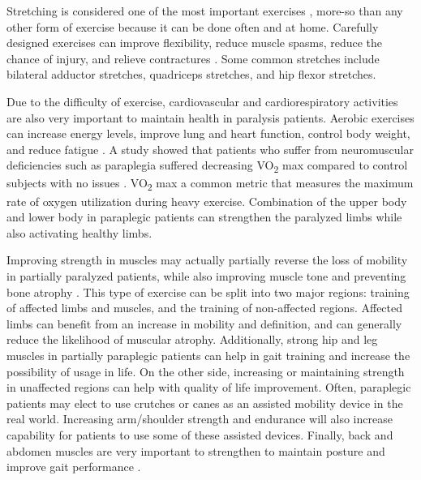Stretching is considered one of the most important exercises \cite{RehabParaplegia}, more-so than any other form of exercise because it can be done often and at home. Carefully designed exercises can improve flexibility, reduce muscle spasms, reduce the chance of injury, and relieve contractures \cite{ParalysisStretchingWeightLoadingPMID} \cite{ParalysisStretchingHarvey} \cite{ParalysisStretchingMichigan}. Some common stretches include bilateral adductor stretches, quadriceps stretches, and hip flexor stretches.

Due to the difficulty of exercise, cardiovascular and cardiorespiratory activities are also very important to maintain health in paralysis patients. Aerobic exercises can increase energy levels, improve lung and heart function, control body weight, and reduce fatigue \cite{RehabParaplegia} \cite{AerobicCapacityParaplegia}. A study showed that patients who suffer from neuromuscular deficiencies such as paraplegia suffered decreasing VO\textsubscript{2} max compared to control subjects with no issues \cite{AerobicCapacityParaplegia}. VO\textsubscript{2} max a common metric that measures the maximum rate of oxygen utilization during heavy exercise. Combination of the upper body and lower body in paraplegic patients can strengthen the paralyzed limbs while also activating healthy limbs.

Improving strength in muscles may actually partially reverse the loss of mobility in partially paralyzed patients, while also improving muscle tone \cite{AerobicCapacityParaplegia} and preventing bone atrophy \cite{ParalysisStretchingWeightLoadingPMID}. This type of exercise can be split into two major regions: training of affected limbs and muscles, and the training of non-affected regions. Affected limbs can benefit from an increase in mobility and definition, and can generally reduce the likelihood of muscular atrophy. Additionally, strong hip and leg muscles in partially paraplegic patients can help in gait training and increase the possibility of usage in life. On the other side, increasing or maintaining strength in unaffected regions can help with quality of life improvement. Often, paraplegic patients may elect to use crutches or canes as an assisted mobility device in the real world. Increasing arm/shoulder strength and endurance will also increase capability for patients to use some of these assisted devices. Finally, back and abdomen muscles are very important to strengthen to maintain posture and improve gait performance \cite{TrunkMuscleLoadingParaplegia}. 

